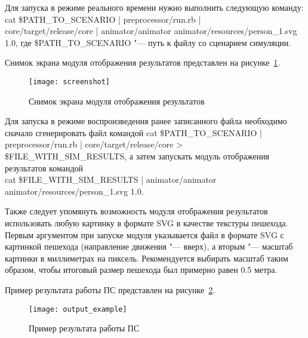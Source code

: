 Для запуска в режиме реального времени нужно выполнить следующую команду:
cat \$PATH\_TO\_SCENARIO \-|\- preprocessor/run.rb \-|\- \\ core/target/release/core \-|\- animator/animator animator/resources/person\_1.svg 1.0,
где \$PATH\_TO\_SCENARIO "--- путь к файлу со сценарием симуляции.

Снимок экрана модуля отображения результатов представлен на рисунке~\ref{sec:manual:launch:scheenshot}.

\begin{figure}[ht]
  \centering
  \texttt{[image: screenshot]}
  \caption{Снимок экрана модуля отображения результатов}
  \label{sec:manual:launch:scheenshot}
\end{figure}

Для запуска в режиме воспроизведения ранее записанного файла необходимо сначало сгенерировать файл командой
cat \$PATH\_TO\_SCENARIO \-|\- preprocessor/run.rb \-|\- core/target/release/core \->\- \$FILE\_WITH\_SIM\_RESULTS,
а затем запускать модуль отображения результатов командой \\
cat \$FILE\_WITH\_SIM\_RESULTS \-|\- animator/animator \\ animator/resources/person\_1.svg 1.0.

Также следует упомянуть возможность модуля отображения результатов использовать любую картинку в формате SVG в качестве текстуры пешехода.
Первым аргументом при запуске модуля указывается файл в формате SVG с картинкой пешехода (направление движения "--- вверх), а вторым "--- масштаб картинки в миллиметрах на пиксель.
Рекомендуется выбирать масштаб таким образом, чтобы итоговый размер пешехода был примерно равен 0.5 метра.

Пример результата работы ПС представлен на рисунке~\ref{sec:manual:launch:result_pic}.

\begin{figure}[ht]
  \texttt{[image: output\_example]}
  \caption{Пример результата работы ПС}
  \label{sec:manual:launch:result_pic}
\end{figure}
